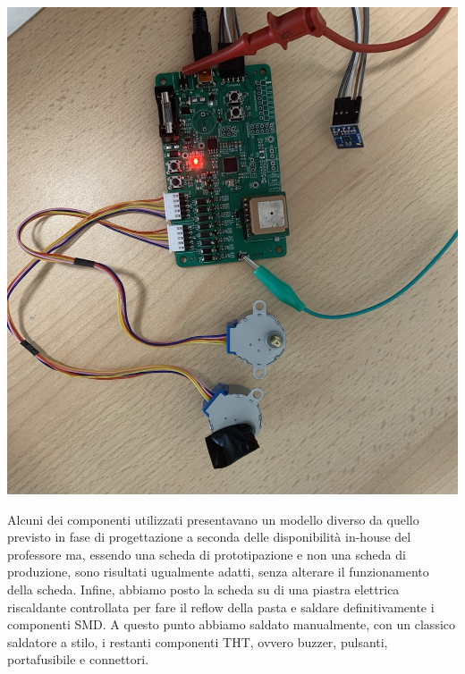\begin{center}
\includegraphics[scale=0.4]{figures/image101.png}
\captionsetup{type=figure}
\end{center}

Alcuni dei componenti utilizzati presentavano un modello diverso da quello previsto
in fase di progettazione a seconda delle disponibilità in-house del professore ma, 
essendo una scheda di prototipazione e non una scheda di produzione, sono risultati 
ugualmente adatti, senza alterare il funzionamento della scheda. Infine, abbiamo posto
la scheda su di una piastra elettrica riscaldante controllata per fare il reflow della 
pasta e saldare definitivamente i componenti SMD. A questo punto abbiamo saldato manualmente, 
con un classico saldatore a stilo, i restanti componenti THT, ovvero buzzer, pulsanti, portafusibile e connettori.


